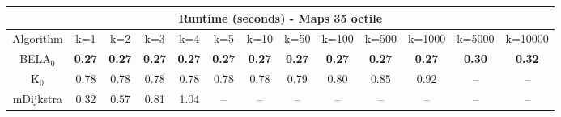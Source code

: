 \begin{tabular}{c|cccccccccccc}\toprule
\multicolumn{13}{c}{Runtime (seconds) - Maps 35 octile}\\ \midrule
Algorithm & k=1 & k=2 & k=3 & k=4 & k=5 & k=10 & k=50 & k=100 & k=500 & k=1000 & k=5000 & k=10000 \\ \midrule
BELA$_0$ & \textbf{0.27} & \textbf{0.27} & \textbf{0.27} & \textbf{0.27} & \textbf{0.27} & \textbf{0.27} & \textbf{0.27} & \textbf{0.27} & \textbf{0.27} & \textbf{0.27} & \textbf{0.30} & \textbf{0.32} \\
K$_0$ & 0.78 & 0.78 & 0.78 & 0.78 & 0.78 & 0.78 & 0.79 & 0.80 & 0.85 & 0.92 & -- & -- \\
mDijkstra & 0.32 & 0.57 & 0.81 & 1.04 & -- & -- & -- & -- & -- & -- & -- & -- \\ \bottomrule 
\end{tabular}
